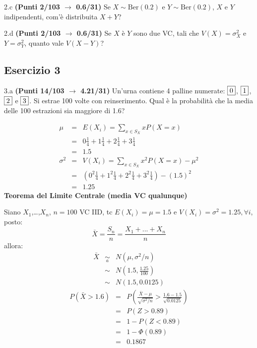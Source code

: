 \documentclass[
  11pt,
]{book}
\theoremstyle{mytheoremstyle}
\theoremstyle{mydefstyle}
\newenvironment{sol}
  {
  \begin{tcolorbox}[enhanced,breakable,arc=0.1mm,boxrule=1pt,colback=white,colframe=iblue,
  title=\bf \fontfamily{lmss}\selectfont \hspace{.5 cm} Soluzione,drop fuzzy shadow]

}{
\end{tcolorbox}
  }
\begin{document}
2.c \textbf{(Punti 2/103 \(\rightarrow\) 0.6/31)} Se \(X\sim\text{Ber}(0.2)\) e \(Y\sim\text{Ber}(0.2)\), \(X\) e \(Y\) indipendenti, com'è distribuita \(X+Y\)?

2.d \textbf{(Punti 2/103 \(\rightarrow\) 0.6/31)} Se \(X\) è \(Y\) sono due VC, tali che \(V(X)=\sigma_X^2\) e \(Y=\sigma_Y^2\), quanto vale \(V(X-Y)\)?

\subsection{Esercizio 3}\label{esercizio-3-21}

3.a \textbf{(Punti 14/103 \(\rightarrow\) 4.21/31)} Un'urna contiene 4 palline numerate: \(\fbox{0}\), \(\fbox{1}\), \(\fbox{2}\) e \(\fbox{3}\). Si estrae 100 volte con reinserimento. Qual è la probabilità che la media delle 100 estrazioni sia maggiore di 1.6?

\begin{sol}
\begin{eqnarray*} \mu &=& E(X_i) = \sum_{x\in S_X}x P(X=x)\\ 
 &=&  0  \frac { 1 }{ 4 }+ 1  \frac { 1 }{ 4 }+ 2  \frac { 1 }{ 4 }+ 3  \frac { 1 }{ 4 } \\ 
            &=& 1.5 \\ 
 \sigma^2 &=& V(X_i) = \sum_{x\in S_X}x^2 P(X=x)-\mu^2\\ 
 &=&\left(  0  ^2\frac { 1 }{ 4 }+ 1  ^2\frac { 1 }{ 4 }+ 2  ^2\frac { 1 }{ 4 }+ 3  ^2\frac { 1 }{ 4 } \right)-( 1.5 )^2\\ 
            &=& 1.25 
\end{eqnarray*}
\textbf{Teorema del Limite Centrale (media VC qualunque)}

Siano \(X_1\),\ldots,\(X_n\), \(n=100\) VC IID, tc \(E(X_i)=\mu=1.5\) e \(V(X_i)=\sigma^2=1.25,\forall i\), posto:
\[
      \bar X=\frac{S_n}n =\frac{X_1 + ... + X_n}n
      \]
allora:\begin{eqnarray*}
  \bar X & \mathop{\sim}\limits_{a}& N(\mu,\sigma^2/n) \\
     &\sim & N\left(1.5,\frac{1.25}{100}\right) \\
     &\sim & N(1.5,0.0125)
  \end{eqnarray*}\begin{eqnarray*}
      P( \bar X   >   1.6 ) 
        &=& P\left(  \frac { \bar X  -  \mu }{ \sqrt{\sigma^2/n} }  >  \frac { 1.6  -  1.5 }{\sqrt{ 0.0125 }} \right)  \\
                 &=& P\left(  Z   >   0.89 \right) \\    &=& 1-P(Z< 0.89 )\\ 
                 &=&  1-\Phi( 0.89 ) \\ &=&  0.1867 
      \end{eqnarray*}

\end{sol}
\end{document}
